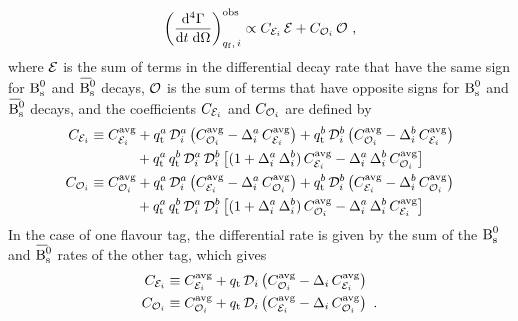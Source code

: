 \begin{equation}
  \label{eq:diffRateObs}
  \left(\frac{\ud^{4} \Gamma}{\ud t \;\ud\Omega}\right)_{\qf,\,i}^{\text{obs}}
    \propto \CEven[i]\,\even + \COdd[i]\,\odd \ ,
\end{equation}
where $\even$ is the sum of terms in the differential decay rate that have the same sign for $\Bs$ and $\Bsbar$ decays, $\odd$ is the sum
of terms that have opposite signs for $\Bs$ and $\Bsbar$ decays, and the coefficients $\CEven[i]$ and $\COdd[i]$ are defined by
\begin{subequations}
  \begin{align}
    \CEven[i] &\equiv \avgCEven[i]
                      + \qt^a\,\dil[i]^a\left(\avgCOdd[i] - \ADilWTag[i]^a\,\avgCEven[i] \right)
                      + \qt^b\,\dil[i]^b\left(\avgCOdd[i] - \ADilWTag[i]^b\,\avgCEven[i] \right) \nonumber\\
                      &\qquad\quad\
                        + \qt^a\,\qt^b\,\dil[i]^a\,\dil[i]^b\left[(1 + \ADilWTag[i]^a\,\ADilWTag[i]^b)\,\avgCEven[i]
                                                                  - \ADilWTag[i]^a\,\ADilWTag[i]^b\,\avgCOdd[i] \right] \\
    \COdd[i] &\equiv \avgCOdd[i]
                      + \qt^a\,\dil[i]^a\left(\avgCEven[i] - \ADilWTag[i]^a\,\avgCOdd[i] \right)
                      + \qt^b\,\dil[i]^b\left(\avgCEven[i] - \ADilWTag[i]^b\,\avgCOdd[i] \right) \nonumber\\
                      &\qquad\quad\
                        + \qt^a\,\qt^b\,\dil[i]^a\,\dil[i]^b\left[(1 + \ADilWTag[i]^a\,\ADilWTag[i]^b)\,\avgCOdd[i]
                                                                  - \ADilWTag[i]^a\,\ADilWTag[i]^b\,\avgCEven[i] \right]
  \end{align}
\end{subequations}
In the case of one flavour tag, the differential rate is given by the sum of the $\Bs$ and $\Bsbar$ rates of the other tag, which gives
\begin{subequations}
  \begin{align}
    \CEven[i] &\equiv \avgCEven[i] + \qt\,\dil[i]\left(\avgCOdd[i]  - \ADilWTag[i]\,\avgCEven[i] \right) \\
    \COdd[i]  &\equiv \avgCOdd[i]  + \qt\,\dil[i]\left(\avgCEven[i] - \ADilWTag[i]\,\avgCOdd[i]  \right) \ .
  \end{align}
\end{subequations}

